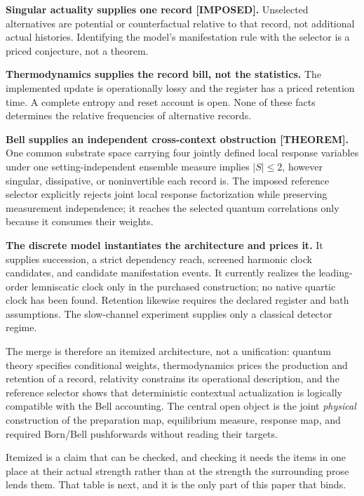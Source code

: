 \documentclass[11pt,a4paper]{article}
\theoremstyle{definition}
\theoremstyle{plain}
\theoremstyle{remark}
\begin{document}
\textbf{Singular actuality supplies one record [IMPOSED].} Unselected
alternatives are potential or counterfactual relative to that record, not
additional actual histories. Identifying the model's manifestation rule
with the selector is a priced conjecture, not a theorem.

\textbf{Thermodynamics supplies the record bill, not the statistics.} The
implemented update is operationally lossy and the register has a priced
retention time. A complete entropy and reset account is open. None of these
facts determines the relative frequencies of alternative records.

\textbf{Bell supplies an independent cross-context obstruction [THEOREM].}
One common substrate space carrying four jointly defined local response
variables under one setting-independent ensemble measure implies
$|S|\le2$, however singular, dissipative, or noninvertible each record is.
The imposed reference selector explicitly rejects joint local response
factorization while preserving measurement independence; it reaches the
selected quantum correlations only because it consumes their weights.

\textbf{The discrete model instantiates the architecture and prices it.}
It supplies succession, a strict dependency reach, screened harmonic
clock candidates, and candidate manifestation events. It currently
realizes the leading-order lemniscatic clock only in the purchased
construction; no native quartic clock has been found. Retention likewise
requires the declared register and bath assumptions. The slow-channel
experiment supplies only a classical detector regime.

The merge is therefore an itemized architecture, not a unification:
quantum theory specifies conditional weights, thermodynamics prices the
production and retention of a record, relativity constrains its operational
description, and the reference selector shows that deterministic contextual
actualization is logically compatible with the Bell accounting. The central
open object is the joint \emph{physical} construction of the preparation map,
equilibrium measure, response map, and required Born/Bell pushforwards without
reading their targets.

Itemized is a claim that can be checked, and checking it needs the items
in one place at their actual strength rather than at the strength the
surrounding prose lends them. That table is next, and it is the only part
of this paper that binds.

\end{document}
